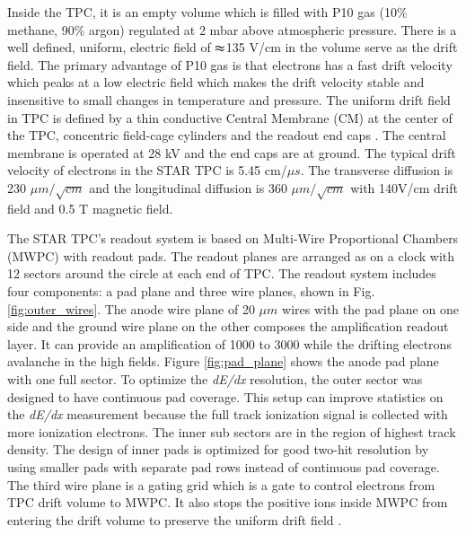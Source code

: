 Inside the TPC, it is an empty volume which is filled with P10 gas
(10\% methane, 90\% argon) regulated at 2 mbar above atmospheric pressure.
There is a well defined, uniform, electric field of $\thickapprox$135
V/cm in the volume serve as the drift field. The primary advantage
of P10 gas is that electrons has a fast drift velocity which peaks
at a low electric field which makes the drift velocity stable and
insensitive to small changes in temperature and pressure. The uniform
drift field in TPC is defined by a thin conductive Central Membrane
(CM) at the center of the TPC, concentric field-cage cylinders and
the readout end caps \cite{Anderson2003659}. The central membrane
is operated at 28 kV and the end caps are at ground. The typical drift
velocity of electrons in the STAR TPC is 5.45 cm/$\mu s$. The transverse
diffusion is 230 $\mu m/\sqrt{cm}$ and the longitudinal diffusion
is 360 $\mu m/\sqrt{cm}$ with 140V/cm drift field and 0.5 T magnetic
field. 

The STAR TPC's readout system is based on Multi-Wire Proportional
Chambers (MWPC) with readout pads. The readout planes are arranged
as on a clock with 12 sectors around the circle at each end of TPC.
The readout system includes four components: a pad plane and three
wire planes, shown in Fig. \ref{fig:outer_wires}. The anode wire
plane of 20 $\mu m$ wires with the pad plane on one side and the
ground wire plane on the other composes the amplification readout
layer. It can provide an amplification of 1000 to 3000 while the drifting
electrons avalanche in the high fields. Figure \ref{fig:pad_plane}
shows the anode pad plane with one full sector. To optimize the \emph{dE/dx
}resolution, the outer sector was designed to have continuous pad
coverage. This setup can improve statistics on the \emph{dE/dx }measurement
because the full track ionization signal is collected with more ionization
electrons. The inner sub sectors are in the region of highest track
density. The design of inner pads is optimized for good two-hit resolution
by using smaller pads with separate pad rows instead of continuous
pad coverage. The third wire plane is a gating grid which is a gate
to control electrons from TPC drift volume to MWPC. It also stops
the positive ions inside MWPC from entering the drift volume to preserve
the uniform drift field \cite{Anderson2003679}.

